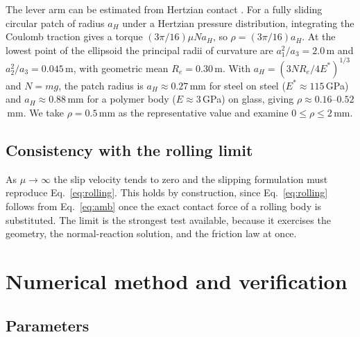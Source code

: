 \documentclass[aps,pre,twocolumn,superscriptaddress,amsmath,amssymb,floatfix,nofootinbib]{revtex4-2}
\begin{document}
The lever arm can be estimated from Hertzian contact \cite{Johnson1985}. For a fully
sliding circular patch of radius $a_H$ under a Hertzian pressure distribution,
integrating the Coulomb traction gives a torque $(3\pi/16)\mu Na_H$, so
$\rho=(3\pi/16)a_H$. At the lowest point of the ellipsoid the principal radii of
curvature are $a_1^2/a_3=2.0$\,m and $a_2^2/a_3=0.045$\,m, with geometric mean
$R_e=0.30$\,m. With $a_H=(3NR_e/4E^*)^{1/3}$ and $N=mg$, the patch radius is
$a_H\approx0.27$\,mm for steel on steel ($E^*\approx115$\,GPa) and $a_H\approx0.88$\,mm
for a polymer body ($E\approx3$\,GPa) on glass, giving $\rho\approx0.16$--$0.52$\,mm. We
take $\rho=0.5$\,mm as the representative value and examine $0\le\rho\le2$\,mm.

\subsection{Consistency with the rolling limit}

As $\mu\to\infty$ the slip velocity tends to zero and the slipping formulation must
reproduce Eq.~\eqref{eq:rolling}. This holds by construction, since
Eq.~\eqref{eq:rolling} follows from Eq.~\eqref{eq:amb} once the exact contact force of a
rolling body is substituted. The limit is the strongest test available, because it
exercises the geometry, the normal-reaction solution, and the friction law at once.

\section{Numerical method and verification}\label{sec:numerics}

\subsection{Parameters}
\end{document}
